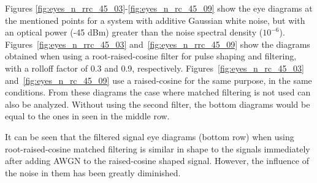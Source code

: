 Figures \ref{fig:eyes_n_rrc_45_03}-\ref{fig:eyes_n_rc_45_09} show the eye diagrams at the mentioned points for a system with additive Gaussian white noise, but with an optical power (-45 dBm) greater than the noise spectral density ($10^{-6}$). Figures~\ref{fig:eyes_n_rrc_45_03} and~\ref{fig:eyes_n_rrc_45_09} show the diagrams obtained when using a root-raised-cosine filter for pulse shaping and filtering, with a rolloff factor of 0.3 and 0.9, respectively. Figures~\ref{fig:eyes_n_rc_45_03} and~\ref{fig:eyes_n_rc_45_09} use a raised-cosine for the same purpose, in the same conditions.
From these diagrams the case where matched filtering is not used can also be analyzed. Without using the second filter, the bottom diagrams would be equal to the ones in seen in the middle row.

It can be seen that the filtered signal eye diagrams (bottom row) when using root-raised-cosine matched filtering is similar in shape to the signals immediately after adding AWGN to the raised-cosine shaped signal. However, the influence of the noise in them has been greatly diminished.

